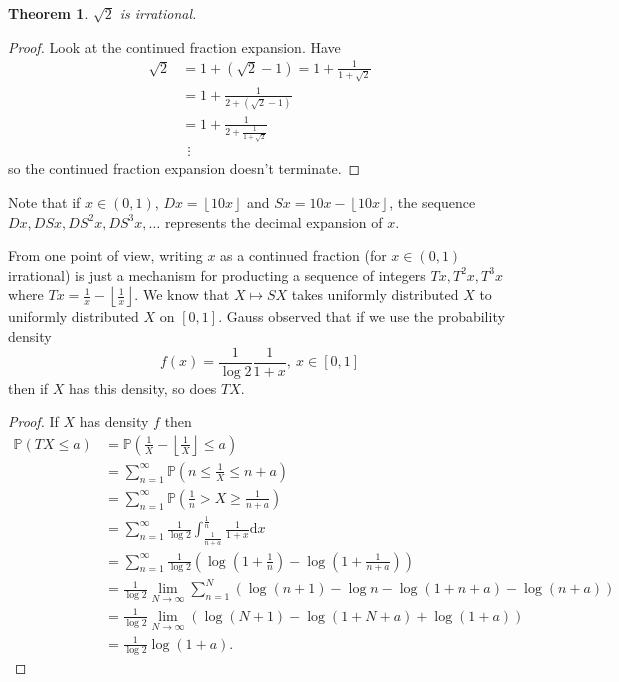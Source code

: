 \documentclass[a4paper, 10pt, twocolumn]{amsart}
\newtheorem*{theorem}{Theorem}
\theoremstyle{definition}
\newcommand{\bb}[1]{\mathbb{#1}}
\newcommand{\1}{\mathbbm{1}}
\newcommand{\floor}[1]{\left\lfloor #1 \right\rfloor}
\begin{document}
\begin{theorem}
    $\sqrt{2}$ is irrational. 
\end{theorem}

\begin{proof}
    Look at the continued fraction expansion. Have \begin{align*}
        \sqrt{2} &= 1+(\sqrt{2}-1) = 1+\frac{1}{1+\sqrt{2}}\\
        &= 1+\frac{1}{2+(\sqrt{2}-1)}\\
        &= 1+\frac{1}{2+\frac{1}{1+\sqrt{2}}}\\
        &\ \ \vdots
    \end{align*}
    so the continued fraction expansion doesn't terminate. 
\end{proof}

Note that if $x \in (0,1)$, $Dx =\floor{10x}$ and $Sx =10x-\floor{10x}$, the sequence $Dx,DSx,DS^2x,DS^3x,\ldots$ represents the decimal expansion of $x$.




From one point of view, writing $x$ as a continued fraction (for $x\in (0,1)$ irrational) is just a mechanism for producting a sequence of integers $Tx,T^2x,T^3x$ where $Tx = \frac{1}{x} -\floor{\frac{1}{x}}$. We know that $X \mapsto SX$ takes uniformly distributed $X$ to uniformly distributed $X$ on $[0,1]$. Gauss observed that if we use the probability density \[f(x) = \frac{1}{\log{2}}\frac{1}{1+x}, \ x\in [0,1]\]
then if $X$ has this density, so does $TX$.

\begin{proof}
    If $X$ has density $f$ then \begin{align*}
        \bb{P}(TX \le a) &= \bb{P}\left(\frac{1}{X} -\floor{\frac{1}{X}} \le a\right)\\
        &=\sum_{n=1}^\infty \bb{P}\left(n\le \frac{1}{X} \le n+a\right)\\
        &= \sum_{n=1}^\infty \bb{P}\left(\frac{1}{n} > X \ge \frac{1}{n+a}\right)\\
        &= \sum_{n=1}^\infty \frac{1}{\log{2}} \int_{\frac{1}{n+a}}^{\frac{1}{n}} \frac{1}{1+x} \mathrm{d}x\\
        &=\sum_{n=1}^\infty \frac{1}{\log{2}} \left(\log\left(1+\frac{1}{n}\right)-\log\left({1+\frac{1}{n+a}}\right)\right)\\
        &=\frac{1}{\log{2}} \lim_{N \to \infty} \sum_{n=1}^N \left(\log(n+1)-\log{n}-\log(1+n+a)-\log(n+a)\right)\\
        &=\frac{1}{\log{2}} \lim_{N\to \infty} \left(\log(N+1)-\log(1+N+a)+\log(1+a)\right)\\
        &=\frac{1}{\log{2}} \log(1+a).
    \end{align*}
\end{proof}
\end{document}
